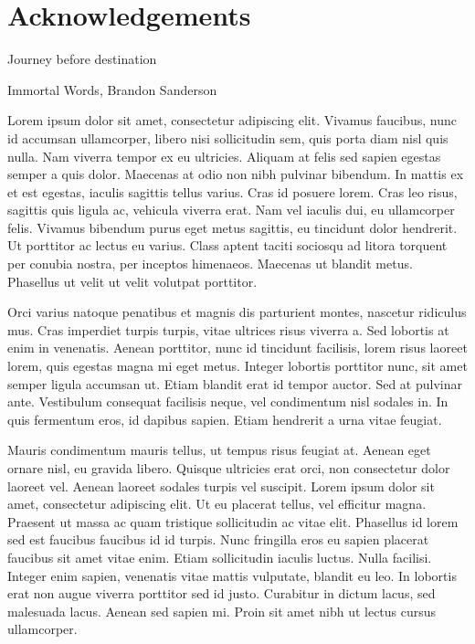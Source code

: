 \chapter{Acknowledgements}

\begin{FraseCelebre}
    \begin{Frase}
    Journey before destination
    \end{Frase}
    \begin{Fuente}
    Immortal Words, Brandon Sanderson
    \end{Fuente}
\end{FraseCelebre}

Lorem ipsum dolor sit amet, consectetur adipiscing elit. Vivamus faucibus, nunc id accumsan ullamcorper, libero nisi sollicitudin sem, quis porta diam nisl quis nulla. Nam viverra tempor ex eu ultricies. Aliquam at felis sed sapien egestas semper a quis dolor. Maecenas at odio non nibh pulvinar bibendum. In mattis ex et est egestas, iaculis sagittis tellus varius. Cras id posuere lorem. Cras leo risus, sagittis quis ligula ac, vehicula viverra erat. Nam vel iaculis dui, eu ullamcorper felis. Vivamus bibendum purus eget metus sagittis, eu tincidunt dolor hendrerit. Ut porttitor ac lectus eu varius. Class aptent taciti sociosqu ad litora torquent per conubia nostra, per inceptos himenaeos. Maecenas ut blandit metus. Phasellus ut velit ut velit volutpat porttitor.

Orci varius natoque penatibus et magnis dis parturient montes, nascetur ridiculus mus. Cras imperdiet turpis turpis, vitae ultrices risus viverra a. Sed lobortis at enim in venenatis. Aenean porttitor, nunc id tincidunt facilisis, lorem risus laoreet lorem, quis egestas magna mi eget metus. Integer lobortis porttitor nunc, sit amet semper ligula accumsan ut. Etiam blandit erat id tempor auctor. Sed at pulvinar ante. Vestibulum consequat facilisis neque, vel condimentum nisl sodales in. In quis fermentum eros, id dapibus sapien. Etiam hendrerit a urna vitae feugiat.

Mauris condimentum mauris tellus, ut tempus risus feugiat at. Aenean eget ornare nisl, eu gravida libero. Quisque ultricies erat orci, non consectetur dolor laoreet vel. Aenean laoreet sodales turpis vel suscipit. Lorem ipsum dolor sit amet, consectetur adipiscing elit. Ut eu placerat tellus, vel efficitur magna. Praesent ut massa ac quam tristique sollicitudin ac vitae elit. Phasellus id lorem sed est faucibus faucibus id id turpis. Nunc fringilla eros eu sapien placerat faucibus sit amet vitae enim. Etiam sollicitudin iaculis luctus. Nulla facilisi. Integer enim sapien, venenatis vitae mattis vulputate, blandit eu leo. In lobortis erat non augue viverra porttitor sed id justo. Curabitur in dictum lacus, sed malesuada lacus. Aenean sed sapien mi. Proin sit amet nibh ut lectus cursus ullamcorper.

